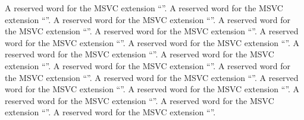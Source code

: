  A reserved word for the MSVC extension ``''.
 A reserved word for the MSVC extension ``''.
 A reserved word for the MSVC extension ``''.
 A reserved word for the MSVC extension ``''.
 A reserved word for the MSVC extension ``''.
 A reserved word for the MSVC extension ``''.
 A reserved word for the MSVC extension ``''.
 A reserved word for the MSVC extension ``''.
 A reserved word for the MSVC extension ``''.
 A reserved word for the MSVC extension ``''.
 A reserved word for the MSVC extension ``''.
 A reserved word for the MSVC extension ``''.
 A reserved word for the MSVC extension ``''.
 A reserved word for the MSVC extension ``''.
 A reserved word for the MSVC extension ``''.
 A reserved word for the MSVC extension ``''.
 A reserved word for the MSVC extension ``''.

